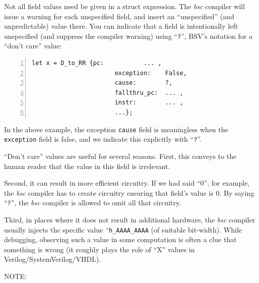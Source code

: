 Not all field values need be given in a struct expression.  The
\emph{bsc} compiler will issue a warning for each unspecified field,
and insert an ``unspecified'' (and unpredictable) value there.  You
can indicate that a field is intentionally left unspecified (and
suppress the compiler warning) using ``\verb|?|'', BSV's notation for
a ``don't care'' value:


{\small
\begin{Verbatim}[frame=single, numbers=left]
      let x = D_to_RR {pc:           ... ,
                       exception:    False,
                       cause:        ?,
                       fallthru_pc:  ... ,
                       instr:        ... ,
                       ...};
\end{Verbatim}
}

In the above example, the exception \verb|cause| field is meaningless
when the \verb|exception| field is false, and we indicate this
explicitly with ``\verb|?|''.

``Don't care'' values are useful for several reasons.  First, this
conveys to the human reader that the value in this field is
irrelevant.

Second, it can result in more efficient circuitry.  If we had said
``0'', for example, the \emph{bsc} compiler has to create circuitry
ensuring that field's value is 0. By saying ``\verb|?|'', the
\emph{bsc} compiler is allowed to omit all that circuitry.

Third, in places where it does not result in additional hardware, the
\emph{bsc} compiler usually injects the specific value
\verb|'h_AAAA_AAAA| (of suitable bit-width).  While debugging,
observing such a value in some computation is often a clue that
something is wrong (it roughly plays the role of ``X'' values in
Verilog/SystemVerilog/VHDL).

\vspace{2ex}

NOTE:

